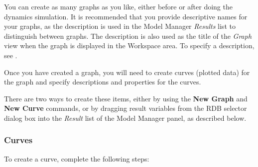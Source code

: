
You can create as many graphs as you like, either before or after doing the
dynamics simulation. It is recommended that you provide descriptive names for
your graphs, as the description is used in the Model Manager {\sl Results}
list to distinguish between graphs. The description is also used as the title
of the {\sl Graph} view when the graph is displayed in the Workspace area.
To specify a description, see .

Once you have created a graph, you will need to create curves (plotted data)
for the graph and specify descriptions and properties for the curves.

There are two ways to create these items, either by using the \textbf{New Graph}
and \textbf{New Curve} commands, or by dragging result variables from the RDB
selector dialog box into the {\sl Result} list of the Model Manager panel,
as described below.



\subsubsection{Curves}

To create a curve, complete the following steps:

\vskip9mm

